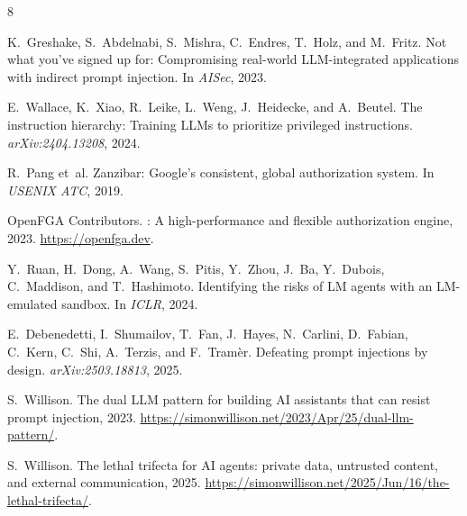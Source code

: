 \documentclass[11pt]{article}
\begin{document}

\begin{thebibliography}{8}

K.~Greshake, S.~Abdelnabi, S.~Mishra, C.~Endres, T.~Holz, and M.~Fritz.
\newblock Not what you've signed up for: Compromising real-world LLM-integrated applications with indirect prompt injection.
\newblock In \emph{AISec}, 2023.

E.~Wallace, K.~Xiao, R.~Leike, L.~Weng, J.~Heidecke, and A.~Beutel.
\newblock The instruction hierarchy: Training {LLMs} to prioritize privileged instructions.
\newblock \emph{arXiv:2404.13208}, 2024.

R.~Pang et~al.
\newblock Zanzibar: {Google's} consistent, global authorization system.
\newblock In \emph{USENIX ATC}, 2019.

{OpenFGA Contributors}.
: A high-performance and flexible authorization engine, 2023.
\newblock \url{https://openfga.dev}.

Y.~Ruan, H.~Dong, A.~Wang, S.~Pitis, Y.~Zhou, J.~Ba, Y.~Dubois, C.~Maddison, and T.~Hashimoto.
\newblock Identifying the risks of {LM} agents with an {LM}-emulated sandbox.
\newblock In \emph{ICLR}, 2024.

E.~Debenedetti, I.~Shumailov, T.~Fan, J.~Hayes, N.~Carlini, D.~Fabian, C.~Kern, C.~Shi, A.~Terzis, and F.~Tram\`{e}r.
\newblock Defeating prompt injections by design.
\newblock \emph{arXiv:2503.18813}, 2025.

S.~Willison.
\newblock The dual {LLM} pattern for building {AI} assistants that can resist prompt injection, 2023.
\newblock \url{https://simonwillison.net/2023/Apr/25/dual-llm-pattern/}.

S.~Willison.
\newblock The lethal trifecta for {AI} agents: private data, untrusted content, and external communication, 2025.
\newblock \url{https://simonwillison.net/2025/Jun/16/the-lethal-trifecta/}.

\end{thebibliography}
\end{document}
